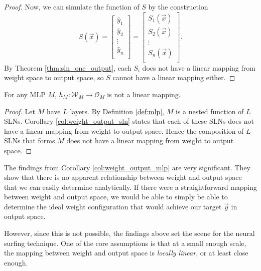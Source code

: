 \begin{proof}
    Now, we can simulate the function of $S$ by the construction
    \begin{equation*}
        S(\vec{x})
        = \begin{bmatrix}
            \hat{y}_1 \\
            \hat{y}_2 \\
            \vdots \\
            \hat{y}_n \\
        \end{bmatrix}
        = \begin{bmatrix}
            S_1(\vec{x}) \\
            S_2(\vec{x}) \\
            \vdots \\
            S_n(\vec{x}) \\
        \end{bmatrix}.
    \end{equation*}
    By Theorem \ref{thm:sln_one_output}, each $S_i$ does not have a linear mapping from weight space to output space, so $S$ cannot have a linear mapping either.
\end{proof}

\begin{corollary}
    \label{col:weight_output_mlp}
    For any MLP $M$, $h_M: \mathcal{W}_M \rightarrow \mathcal{O}_M$ is not a linear mapping.
\end{corollary}
\begin{proof}
    Let $M$ have $L$ layers.
    By Definition \ref{def:mlp}, $M$ is a nested function of $L$ SLNs. 
    Corollary \ref{col:weight_output_sln} states that each of these SLNs does not have a linear mapping from weight to output space.
    Hence the composition of $L$ SLNs that forms $M$ does not have a linear mapping from weight to output space.
\end{proof}

\begin{remark}
    The findings from Corollary \ref{col:weight_output_mlp} are very significant.
    They show that there is no apparent relationship between weight and output space that we can easily determine analytically. 
    If there were a straightforward mapping between weight and output space, we would be able to simply be able to determine the ideal weight configuration that would achieve our target $\vec{y}$ in output space. 
    
    However, since this is not possible, the findings above set the scene for the neural surfing technique. 
    One of the core assumptions is that at a small enough scale, the mapping between weight and output space is \textit{locally linear}, or at least close enough.
\end{remark}

